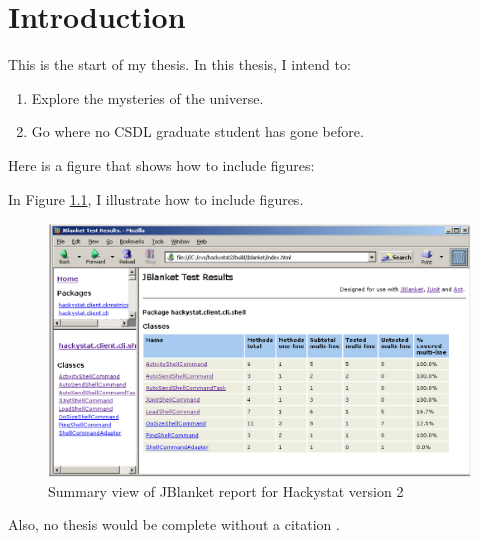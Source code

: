 
\chapter{Introduction}

This is the start of my thesis.  In this thesis, I intend to:

\begin{enumerate}
\item Explore the mysteries of the universe.
\item Go where no CSDL graduate student has gone before.
\end{enumerate}

Here is a figure that shows how to include figures:

In Figure \ref{fig:hackystat2}, I illustrate how to include figures.

\begin{figure}[htbp]
  \centering
  \includegraphics[width=1.0\textwidth]{figs/hackystat2.jblanket.package.eps}
  \caption{Summary view of JBlanket report for Hackystat version 2}
  \label{fig:hackystat2}
\end{figure}

Also, no thesis would be complete without a citation \cite{csdl2-03-01}.

